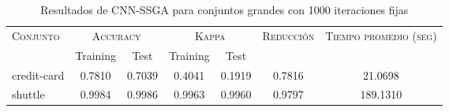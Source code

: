 \begin{table}[]
\centering
\begin{tabular}{l c c c c c c}
\hline
\multirow{2}{*}{\textsc{Conjunto}}
	& \multicolumn{2}{c}{\textsc{Accuracy}}
	& \multicolumn{2}{c}{\textsc{Kappa}}
	& \textsc{Reducción}
	& \textsc{Tiempo promedio (seg)} \\
	& Training & Test
	& Training & Test \\ 
\hline
\hline

credit-card & 0.7810 & 0.7039 & 0.4041 & 0.1919 & 0.7816 & 21.0698 \\
shuttle & 0.9984 & 0.9986 & 0.9963 & 0.9960 & 0.9797 & 189.1310 \\

\hline
\end{tabular}
\caption{Resultados de CNN-SSGA para conjuntos grandes con 1000 iteraciones fijas}
\label{res-grande-cnn-ssga}
\end{table}

